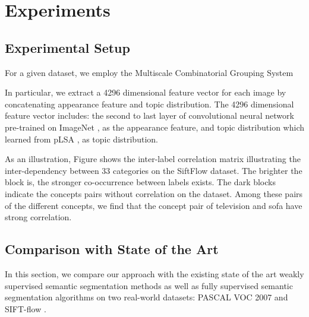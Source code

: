 \section{Experiments}

\subsection{Experimental Setup}
For a given dataset, we employ the Multiscale Combinatorial Grouping System \cite{arbelaez2014multiscale} 

In particular, we extract a 4296 dimensional feature vector for each image by concatenating appearance feature and topic distribution. The 4296 dimensional feature vector includes: the second to last layer of convolutional neural network\cite{simonyan2014very} pre-trained on ImageNet \cite{russakovsky2014imagenet}, as the appearance feature, and topic distribution which learned from pLSA \cite{hofmann1999probabilistic}, as topic distribution.

As an illustration, Figure shows the inter-label correlation matrix illustrating the inter-dependency between 33 categories on the SiftFlow dataset. The brighter the block is, the stronger co-occurrence between labels exists. The dark blocks indicate the concepts pairs without correlation on the dataset.
Among these pairs of the different concepts, we find that the concept pair of television and sofa have strong correlation.


\subsection{Comparison with State of the Art}
In this section, we compare our approach with the existing state of the art weakly supervised semantic segmentation methods as well as fully supervised semantic segmentation algorithms on two real-world datasets: PASCAL VOC 2007 \cite{pascal-voc-2007} and SIFT-flow \cite{liu2011nonparametric}.

